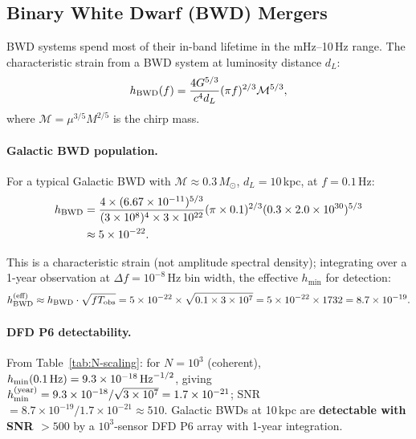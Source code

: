 \documentclass[11pt]{article}
\theoremstyle{definition}
\theoremstyle{remark}
\newcommand{\Msun}{M_\odot}
\newcommand{\sqrtHz}{\,\mathrm{Hz}^{-1/2}}
\newcommand{\ee}[1]{\times10^{#1}}
\begin{document}
\subsection{Binary White Dwarf (BWD) Mergers}

BWD systems spend most of their in-band lifetime in the mHz--10\,Hz range.
The characteristic strain from a BWD system at luminosity distance $d_L$:
\begin{equation}
h_{\rm BWD}(f) = \frac{4 G^{5/3}}{c^4 d_L}
(\pi f)^{2/3} \mathcal{M}^{5/3},
\label{eq:BWD-strain}
\end{equation}
where $\mathcal{M} = \mu^{3/5} M^{2/5}$ is the chirp mass.

\paragraph{Galactic BWD population.}
For a typical Galactic BWD with $\mathcal{M} \approx 0.3\,\Msun$,
$d_L = 10$\,kpc, at $f = 0.1$\,Hz:
\begin{align}
h_{\rm BWD} &= \frac{4 \times (6.67\ee{-11})^{5/3}}{(3\ee{8})^4 \times 3\ee{22}}
(\pi \times 0.1)^{2/3} (0.3 \times 2.0\ee{30})^{5/3} \notag \\
&\approx 5\ee{-22}.
\end{align}

This is a characteristic strain (not amplitude spectral density); integrating
over a 1-year observation at $\Delta f = 10^{-8}$\,Hz bin width,
the effective $h_{\min}$ for detection:
\begin{equation}
h_{\rm BWD}^{(\rm eff)} \approx h_{\rm BWD} \cdot \sqrt{f T_{\rm obs}}
= 5\ee{-22} \times \sqrt{0.1 \times 3\ee{7}} = 5\ee{-22} \times 1732
= 8.7\ee{-19}.
\end{equation}

\paragraph{DFD P6 detectability.}
From Table~\ref{tab:N-scaling}: for $N=10^3$ (coherent), $h_{\min}(0.1\,\rm Hz)
= 9.3\ee{-18}\sqrtHz$, giving $h_{\min}^{(\rm year)} = 9.3\ee{-18}/\sqrt{3\ee{7}}
= 1.7\ee{-21}$; SNR $= 8.7\ee{-19}/1.7\ee{-21} \approx 510$.  Galactic BWDs
at 10\,kpc are \textbf{detectable with SNR $> 500$} by a $10^3$-sensor
DFD P6 array with 1-year integration.
\end{document}
